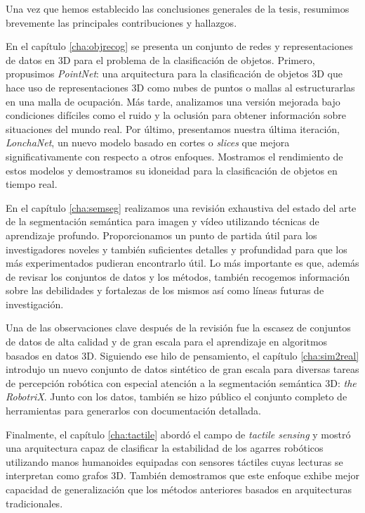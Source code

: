Una vez que hemos establecido las conclusiones generales de la tesis, resumimos brevemente las principales contribuciones y hallazgos.

En el capítulo \ref{cha:objrecog} se presenta un conjunto de redes y representaciones de datos en 3D para el problema de la clasificación de objetos. Primero, propusimos \emph{PointNet}: una arquitectura para la clasificación de objetos \acs{3D} que hace uso de representaciones \acs{3D} como nubes de puntos o mallas al estructurarlas en una malla de ocupación. Más tarde, analizamos una versión mejorada bajo condiciones difíciles como el ruido y la oclusión para obtener información sobre situaciones del mundo real. Por último, presentamos nuestra última iteración, \emph{LonchaNet}, un nuevo modelo basado en cortes o \emph{slices} que mejora significativamente con respecto a otros enfoques. Mostramos el rendimiento de estos modelos y demostramos su idoneidad para la clasificación de objetos en tiempo real.

En el capítulo \ref{cha:semseg} realizamos una revisión exhaustiva del estado del arte de la segmentación semántica para imagen y vídeo utilizando técnicas de aprendizaje profundo. Proporcionamos un punto de partida útil para los investigadores noveles y también suficientes detalles y profundidad para que los más experimentados pudieran encontrarlo útil. Lo más importante es que, además de revisar los conjuntos de datos y los métodos, también recogemos información sobre las debilidades y fortalezas de los mismos así como líneas futuras de investigación.

Una de las observaciones clave después de la revisión fue la escasez de conjuntos de datos de alta calidad y de gran escala para el aprendizaje en algoritmos basados en datos \ac{3D}. Siguiendo ese hilo de pensamiento, el capítulo \ref{cha:sim2real} introdujo un nuevo conjunto de datos sintético de gran escala para diversas tareas de percepción robótica con especial atención a la segmentación semántica 3D: \emph{the RobotriX}. Junto con los datos, también se hizo público el conjunto completo de herramientas para generarlos con documentación detallada.

Finalmente, el capítulo \ref{cha:tactile} abordó el campo de \emph{tactile sensing} y mostró una arquitectura capaz de clasificar la estabilidad de los agarres robóticos utilizando manos humanoides equipadas con sensores táctiles cuyas lecturas se interpretan como grafos \acs{3D}. También demostramos que este enfoque exhibe mejor capacidad de generalización que los métodos anteriores basados en arquitecturas tradicionales.

